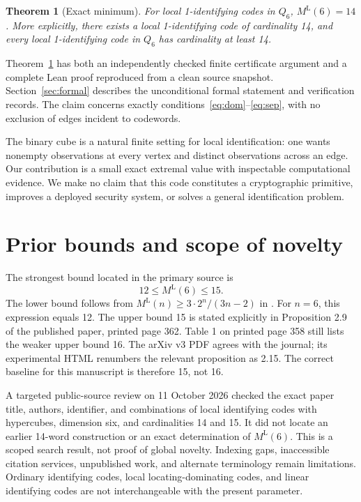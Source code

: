 \documentclass[11pt]{article}
\newtheorem{theorem}{Theorem}
\newcommand{\ML}{M^{\mathrm L}}
\begin{document}
\begin{theorem}[Exact minimum]\label{thm:main}
For local 1-identifying codes in $Q_6$, $\ML(6)=14$. More explicitly, there exists a local 1-identifying code of cardinality 14, and every local 1-identifying code in $Q_6$ has cardinality at least 14.
\end{theorem}
Theorem~\ref{thm:main} has both an independently checked finite certificate argument and a complete Lean proof reproduced from a clean source snapshot. Section~\ref{sec:formal} describes the unconditional formal statement and verification records. The claim concerns exactly conditions~\eqref{eq:dom}--\eqref{eq:sep}, with no exclusion of edges incident to codewords.

The binary cube is a natural finite setting for local identification: one wants nonempty observations at every vertex and distinct observations across an edge. Our contribution is a small exact extremal value with inspectable computational evidence. We make no claim that this code constitutes a cryptographic primitive, improves a deployed security system, or solves a general identification problem.

\section{Prior bounds and scope of novelty}
The strongest bound located in the primary source is
\[
 12\leq\ML(6)\leq15.
\]
The lower bound follows from $\ML(n)\geq3\cdot2^n/(3n-2)$ in \cite{hll}. For $n=6$, this expression equals 12. The upper bound 15 is stated explicitly in Proposition 2.9 of the published paper, printed page 362. Table 1 on printed page 358 still lists the weaker upper bound 16. The arXiv v3 PDF agrees with the journal; its experimental HTML renumbers the relevant proposition as 2.15. The correct baseline for this manuscript is therefore 15, not 16.

A targeted public-source review on 11 October 2026 checked the exact paper title, authors, identifier, and combinations of local identifying codes with hypercubes, dimension six, and cardinalities 14 and 15. It did not locate an earlier 14-word construction or an exact determination of $\ML(6)$. This is a scoped search result, not proof of global novelty. Indexing gaps, inaccessible citation services, unpublished work, and alternate terminology remain limitations. Ordinary identifying codes, local locating-dominating codes, and linear identifying codes are not interchangeable with the present parameter.
\end{document}
